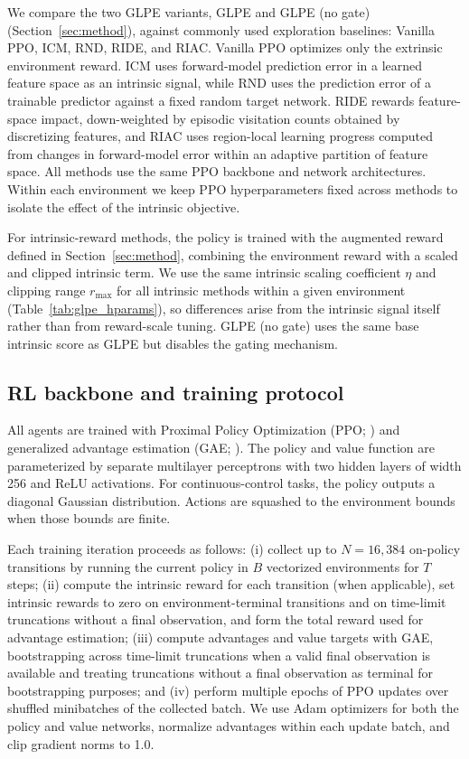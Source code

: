 We compare the two GLPE variants, GLPE and GLPE (no gate) (Section~\ref{sec:method}), against commonly used exploration baselines: Vanilla PPO, ICM, RND, RIDE, and RIAC.
Vanilla PPO optimizes only the extrinsic environment reward.
ICM uses forward-model prediction error in a learned feature space as an intrinsic signal, while RND uses the prediction error of a trainable predictor against a fixed random target network.
RIDE rewards feature-space impact, down-weighted by episodic visitation counts obtained by discretizing features, and RIAC uses region-local learning progress computed from changes in forward-model error within an adaptive partition of feature space.
All methods use the same PPO backbone and network architectures.
Within each environment we keep PPO hyperparameters fixed across methods to isolate the effect of the intrinsic objective.

For intrinsic-reward methods, the policy is trained with the augmented reward defined in Section~\ref{sec:method}, combining the environment reward with a scaled and clipped intrinsic term.
We use the same intrinsic scaling coefficient $\eta$ and clipping range $r_{\max}$ for all intrinsic methods within a given environment (Table~\ref{tab:glpe_hparams}), so differences arise from the intrinsic signal itself rather than from reward-scale tuning.
GLPE (no gate) uses the same base intrinsic score as GLPE but disables the gating mechanism.



\subsection{RL backbone and training protocol}
\label{sec:experimental_setup:training}

All agents are trained with Proximal Policy Optimization (PPO; \cite{schulman-2017}) and generalized advantage estimation (GAE; \cite{schulman-2015}).
The policy and value function are parameterized by separate multilayer perceptrons with two hidden layers of width 256 and ReLU activations.
For continuous-control tasks, the policy outputs a diagonal Gaussian distribution.
Actions are squashed to the environment bounds when those bounds are finite.

Each training iteration proceeds as follows:
(i) collect up to $N=16{,}384$ on-policy transitions by running the current policy in $B$ vectorized environments for $T$ steps;
(ii) compute the intrinsic reward for each transition (when applicable), set intrinsic rewards to zero on environment-terminal transitions and on time-limit truncations without a final observation, and form the total reward used for advantage estimation;
(iii) compute advantages and value targets with GAE, bootstrapping across time-limit truncations when a valid final observation is available and treating truncations without a final observation as terminal for bootstrapping purposes; and
(iv) perform multiple epochs of PPO updates over shuffled minibatches of the collected batch.
We use Adam optimizers for both the policy and value networks, normalize advantages within each update batch, and clip gradient norms to 1.0.

